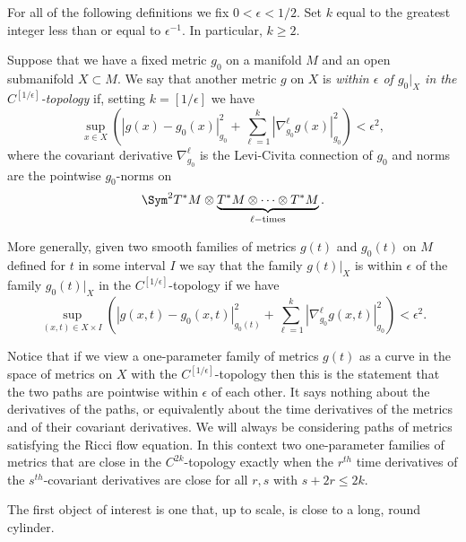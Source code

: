 For all of the following definitions we fix $0<\epsilon<1/2$. Set
$k$ equal to the greatest integer less than or equal to
$\epsilon^{-1}$. In particular, $k\ge 2$.

\begin{definition}
\label{def:epsilon-close-topology}
\label{epsclose}
Suppose that we have a fixed metric $g_0$ on a manifold $M$ and an
open submanifold $X\subset M$. We say that another metric $g$ on $X$
is {\em within $\epsilon$ of $g_0|_X$ in the
$C^{[1/\epsilon]}$-topology} if, setting $k=[1/\epsilon]$ we have
\begin{equation}\label{eqnepsclose}\sup_{x\in X}\left(|g(x)-g_0(x)|_{g_0}^2+
\sum_{\ell=1}^k|\nabla_{g_0}^\ell g(x)|_{g_0}^2\right)<
\epsilon^2,\end{equation} where the covariant derivative
$\nabla^\ell_{g_0}$ is the Levi-Civita connection of $g_0$ and
norms are the pointwise $g_0$-norms on
$$\Sym^2T^*M\otimes \underbrace{T^*M\otimes\cdots\otimes
T^*M}_{\ell-\mathrm{times}}.$$

More generally, given two smooth families of metrics $g(t)$ and
$g_0(t)$ on $M$ defined for $t$ in some interval $I$ we say that
the family $g(t)|_X$ is within $\epsilon$ of the family $g_0(t)|_X$
in the $C^{[1/\epsilon]}$-topology if we have
$$\sup_{(x,t)\in X\times I}\left(\left| g(x,t)
-g_0(x,t)\right|_{g_0(t)}^2 +\sum_{\ell=1}^k\left|\nabla_{g_0}^\ell
g(x,t)\right|_{g_0}^2\right)<\epsilon^2.$$
\end{definition}

\begin{remark}
\label{rem:ricci-flow-metric-topology}
Notice that if we view a one-parameter family of metrics $g(t)$ as a
curve in the space of metrics on $X$ with the
$C^{[1/\epsilon]}$-topology then this is the statement that the two
paths are pointwise within $\epsilon$ of each other. It says nothing
about the derivatives of the paths, or equivalently about the time
derivatives of the metrics and of their covariant derivatives. We
will always be considering paths of metrics satisfying the Ricci
flow equation. In this context two one-parameter families of metrics
that are close in the $C^{2k}$-topology exactly when the $r^{th}$
time derivatives of the $s^{th}$-covariant derivatives are close for
all $r,s$ with $s+2r\le 2k$.
\end{remark}

The first object of interest is one that, up to scale, is close to a
long, round cylinder.


